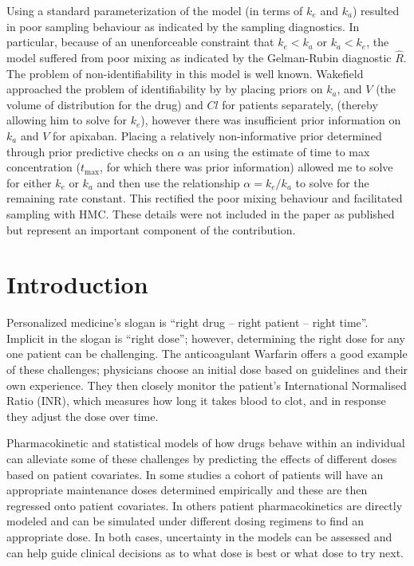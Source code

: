 Using a standard parameterization of the model (in terms of $k_e$ and $k_a$) resulted in poor sampling behaviour as indicated by the sampling diagnostics.  In particular, because of an unenforceable constraint that $k_e < k_a$ or $k_a < k_e$, the model suffered from poor mixing as indicated by the Gelman-Rubin diagnostic $\hat{R}$.  The problem of non-identifiability in this model is well known.  Wakefield approached the problem of identifiability by \cite{wakefield1992bayesian} by placing priors on $k_a$, and $V$ (the volume of distribution for the drug) and $Cl$ for patients separately, (thereby allowing him to solve for $k_e$), however there was insufficient prior information on $k_a$ and $V$ for apixaban.
Placing a relatively non-informative prior determined through prior predictive checks on $\alpha$ an using the estimate of time to max concentration ($t_{\max}$, for which there was prior information) allowed me to solve for either $k_e$ or $k_a$ and then use the relationship $\alpha = k_e / k_a$ to solve for the remaining rate constant.  This rectified the poor mixing behaviour and facilitated sampling with HMC.  These details were not included in the paper as published but represent an important component of the contribution.

\newpage


\section{Introduction}

Personalized medicine’s slogan is ``right drug -- right patient -- right time''.  Implicit in the slogan is ``right dose''; however, determining the right dose for any one patient can be challenging. The anticoagulant Warfarin offers a good example of these challenges; physicians choose an initial dose based on guidelines and their own experience. They then closely monitor the patient’s International Normalised Ratio (INR), which measures how long it takes blood to clot, and in response they adjust the dose over time.

Pharmacokinetic and statistical models of how drugs behave within an individual can alleviate some of these challenges by predicting the effects of different doses based on patient covariates. In some studies \cite{schwarz2008genetic,Sohrabi2017-zv, Caldwell2007-mi}  a cohort of patients will have an appropriate maintenance doses determined empirically and these are then regressed onto patient covariates.  In others \cite{ohara2019differences,Zhu2017-rk, Xue2017-mp}  patient pharmacokinetics are directly modeled and can be simulated under different dosing regimens to find an appropriate dose.  In both cases, uncertainty in the models can be assessed and can help guide clinical decisions as to what dose is best or what dose to try next.

